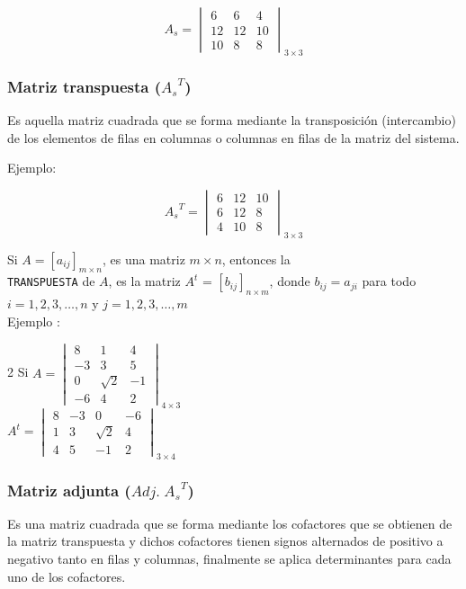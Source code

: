 \documentclass[12pt, a5paper]{article}
\begin{document}
$$
A_s = \begin{vmatrix}
6 & 6 & 4 \\
12 & 12 & 10 \\
10 & 8 & 8
\end{vmatrix}_{3 \times 3}
$$

\subsubsection*{Matriz transpuesta ({\Large ${A_s}^T$})}
Es aquella matriz cuadrada que se forma mediante la transposición (intercambio) de los elementos de filas en columnas o columnas en filas de la matriz del sistema.

\noindent Ejemplo:

$$
{A_s}^T = \begin{vmatrix} 6 & 12 & 10 \\
6 & 12 & 8 \\
4 & 10 & 8 \end{vmatrix}_{3 \times 3}
$$

\noindent Si {\large $A = [a_{ij}]_{m \times n}$}, es una matriz $m \times n$, entonces la \\ \texttt{TRANSPUESTA} de $A$, es la matriz {\large $A^t$ = $[b_{ij}]_{n \times m}$}, donde {\large $b_{ij} = a_{ji}$} para todo $i = 1, 2, 3, \ldots, n$ y $j = 1, 2, 3, \ldots, m$ \\

\noindent Ejemplo :

\begin{multicols}{2}
Si $A = \begin{vmatrix} 8 & 1 & 4 \\ -3 & 3 & 5 \\ 0 & \sqrt{2} & -1 \\ -6 & 4 & 2 \end{vmatrix}_{4 \times 3}$ \\

$A^t = \begin{vmatrix} 8 & -3 & 0 & -6 \\ 1 & 3 & \sqrt{2} & 4 \\ 4 & 5 & -1 & 2 \end{vmatrix}_{3 \times 4}$
\end{multicols}

\subsubsection*{Matriz adjunta ($Adj.\;{A_s}^T$)}
Es una matriz cuadrada que se forma mediante los cofactores que se obtienen de la matriz transpuesta y dichos cofactores tienen signos  alternados de positivo a negativo tanto en filas y columnas, finalmente se aplica determinantes para cada uno de los cofactores.
\end{document}
